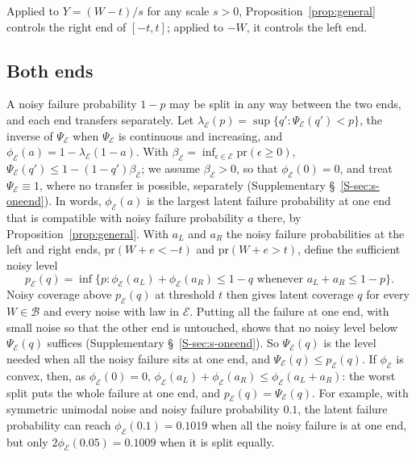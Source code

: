 \documentclass[lineno]{biometrika}
\newcommand{\pr}{\mathrm{pr}}
\begin{document}
Applied to $Y = (W - t)/s$ for any scale $s > 0$, Proposition~\ref{prop:general} controls the right end of $[-t, t]$; applied to $-W$, it controls the left end.

\subsection{Both ends}

A noisy failure probability $1 - p$ may be split in any way between the two ends, and each end transfers separately. Let $\lambda_{\mathcal E}(p) = \sup\{q' : \Psi_{\mathcal E}(q') < p\}$, the inverse of $\Psi_{\mathcal E}$ when $\Psi_{\mathcal E}$ is continuous and increasing, and $\phi_{\mathcal E}(a) = 1 - \lambda_{\mathcal E}(1 - a)$. With $\beta_{\mathcal E} = \inf_{\epsilon \in \mathcal E} \pr(\epsilon \ge 0)$, $\Psi_{\mathcal E}(q') \le 1 - (1 - q')\beta_{\mathcal E}$; we assume $\beta_{\mathcal E} > 0$, so that $\phi_{\mathcal E}(0) = 0$, and treat $\Psi_{\mathcal E} \equiv 1$, where no transfer is possible, separately (Supplementary \S~\ref{S-sec:s-oneend}). In words, $\phi_{\mathcal E}(a)$ is the largest latent failure probability at one end that is compatible with noisy failure probability $a$ there, by Proposition~\ref{prop:general}. With $a_L$ and $a_R$ the noisy failure probabilities at the left and right ends, $\pr(W + e < -t)$ and $\pr(W + e > t)$, define the sufficient noisy level
\begin{equation}\label{eq:pE}
p_{\mathcal E}(q) = \inf\{p : \phi_{\mathcal E}(a_L) + \phi_{\mathcal E}(a_R) \le 1 - q \text{ whenever } a_L + a_R \le 1 - p\}.
\end{equation}
Noisy coverage above $p_{\mathcal E}(q)$ at threshold $t$ then gives latent coverage $q$ for every $W \in \mathcal B$ and every noise with law in $\mathcal E$. Putting all the failure at one end, with small noise so that the other end is untouched, shows that no noisy level below $\Psi_{\mathcal E}(q)$ suffices (Supplementary \S~\ref{S-sec:s-oneend}). So $\Psi_{\mathcal E}(q)$ is the level needed when all the noisy failure sits at one end, and $\Psi_{\mathcal E}(q) \le p_{\mathcal E}(q)$. If $\phi_{\mathcal E}$ is convex, then, as $\phi_{\mathcal E}(0) = 0$, $\phi_{\mathcal E}(a_L) + \phi_{\mathcal E}(a_R) \le \phi_{\mathcal E}(a_L + a_R)$: the worst split puts the whole failure at one end, and $p_{\mathcal E}(q) = \Psi_{\mathcal E}(q)$. For example, with symmetric unimodal noise and noisy failure probability $0.1$, the latent failure probability can reach $\phi_{\mathcal E}(0.1) = 0.1019$ when all the noisy failure is at one end, but only $2\phi_{\mathcal E}(0.05) = 0.1009$ when it is split equally.
\end{document}
